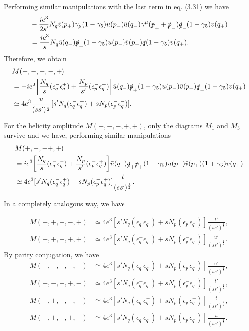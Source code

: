Performing similar manipulations with the last term in eq. (3.31) we have 
\begin{align}
&-\frac{ie^3}{2s'}N_q\bar{v}(p_+)\gamma_\mu(1-\gamma_5)u(p_-)\bar{u}(q_-)\gamma^\mu(\slashed p_++\slashed p_-)\slashed q_-(1-\gamma_5)v(q_+)\nonumber\\
&=\frac{ie^3}{s}N_q\bar{u}(q_-)\slashed p_+(1-\gamma_5)u(p_-)\bar{v}(p_+)\slashed q (1-\gamma_5)v(q_+).
\end{align}
Therefore, we obtain
\begin{align}
&M(+,-,+,-,+)\nonumber\\
&=-ie^3\biggl[\frac{N_q}{s}(\epsilon^-_q\epsilon^+_q)+\frac{N_p}{s'}(\epsilon^-_p\epsilon^+_q) \biggr]\bar{u}(q_-)\slashed p_+(1-\gamma_5)u(p_-)\bar{v}(p_-)\slashed q_-(1-\gamma_5)v(q_+)\nonumber\\
&\simeq 4e^3\frac{u}{(ss')^\frac{1}{2}}[s'N_q(\epsilon_q^-\epsilon^+_q)+sN_p(\epsilon_p^-\epsilon^+_q)].
\end{align}

For the helicity amplitude $M(+,-,-,+,+)$, only the diagrams $M_1$ and $M_3$ survive and we have, performing similar manipulations 
\begin{align}
&M(+,-,-+,+)\nonumber\\
&=ie^3\biggl[\frac{N_q}{s}(\epsilon_q^-\epsilon_q^+)+\frac{N_p}{s'}(\epsilon_p^-\epsilon_q^+) \biggr] \bar{u}(q_-)\slashed q_+\slashed p_+(1-\gamma_5)u(p_-)\bar{v}(p_+)(1+\gamma_5)v(q_+)\nonumber\\
&\simeq 4e^3[s'N_q(\epsilon_q^-\epsilon_q^+)+sN_p(\epsilon_p^-\epsilon_q^+)]\frac{t}{(ss')^\frac{1}{2}}.
\end{align}

In a completely analogous way, we have

\begin{align}
M(-,+,+,-,+)
&\simeq 4e^3[s'N_q(\epsilon_q^-\epsilon_q^+)+sN_p(\epsilon_p^-\epsilon_q^+)]\frac{t'}{(ss')^\frac{1}{2}},\nonumber\\
M(-,+,-,+,+)
&\simeq 4e^3[s'N_q(\epsilon_q^-\epsilon_q^+)+sN_p(\epsilon_p^-\epsilon_q^+)]\frac{u'}{(ss')^\frac{1}{2}}.
\end{align}
By parity conjugation, we have
\begin{align}
M(+,-,+,-,-)
&\simeq 4e^3[s'N_q(\epsilon_q^-\epsilon_q^+)+sN_p(\epsilon_p^-\epsilon_q^+)]\frac{u'}{(ss')^\frac{1}{2}},\nonumber\\
M(+,-,-,+,-)
&\simeq 4e^3[s'N_q(\epsilon_q^-\epsilon_q^+)+sN_p(\epsilon_p^-\epsilon_q^+)]\frac{t'}{(ss')^\frac{1}{2}},\nonumber\\
M(-,+,+,-,-)
&\simeq 4e^3[s'N_q(\epsilon_q^-\epsilon_q^+)+sN_p(\epsilon_p^-\epsilon_q^+)]\frac{t}{(ss')^\frac{1}{2}},\nonumber\\
M(-,+,-,+,-)
&\simeq 4e^3[s'N_q(\epsilon_q^-\epsilon_q^+)+sN_p(\epsilon_p^-\epsilon_q^+)]\frac{u}{(ss')^\frac{1}{2}}.
\end{align}

